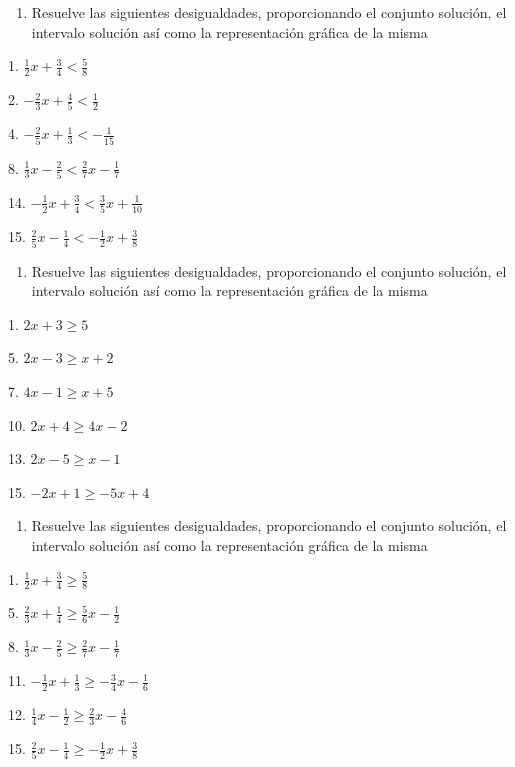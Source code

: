 \documentclass[]{book}
\providecommand{\tightlist}{%
  \setlength{\itemsep}{0pt}\setlength{\parskip}{0pt}}
\begin{document}
\begin{enumerate}
\def\labelenumi{\arabic{enumi}.}
\setcounter{enumi}{8}
\tightlist
\item
  Resuelve las siguientes desigualdades, proporcionando el conjunto
  solución, el intervalo solución así como la representación gráfica de
  la misma
\end{enumerate}

\begin{multicols}{2}
1. $\frac{1}{2}x+\frac{3}{4}<\frac{5}{8}$

2. $-\frac{2}{3}x+\frac{4}{5}<\frac{1}{2}$

4. $-\frac{2}{5}x+\frac{1}{3}<-\frac{1}{15}$

8. $\frac{1}{3}x-\frac{2}{5}<\frac{2}{7}x-\frac{1}{7}$

14. $-\frac{1}{2}x+\frac{3}{4}<\frac{3}{5}x+\frac{1}{10}$

15. $\frac{2}{5}x-\frac{1}{4}<-\frac{1}{2}x+\frac{3}{8}$
\end{multicols}

\begin{enumerate}
\def\labelenumi{\arabic{enumi}.}
\setcounter{enumi}{9}
\tightlist
\item
  Resuelve las siguientes desigualdades, proporcionando el conjunto
  solución, el intervalo solución así como la representación gráfica de
  la misma
\end{enumerate}

\begin{multicols}{2}
1. $2x + 3 \geq 5$

5. $2x - 3 \geq x + 2$

7. $4x - 1 \geq x + 5$

10. $2x + 4 \geq 4x - 2$

13. $2x - 5 \geq x - 1$

15. $-2x + 1 \geq -5x + 4$
\end{multicols}

\begin{enumerate}
\def\labelenumi{\arabic{enumi}.}
\setcounter{enumi}{10}
\tightlist
\item
  Resuelve las siguientes desigualdades, proporcionando el conjunto
  solución, el intervalo solución así como la representación gráfica de
  la misma
\end{enumerate}

\begin{multicols}{2}
1. $\frac{1}{2}x + \frac{3}{4} \geq \frac{5}{8}$

5. $\frac{2}{3}x + \frac{1}{4} \geq \frac{5}{6}x - \frac{1}{2}$

8. $\frac{1}{3}x - \frac{2}{5} \geq \frac{2}{7}x - \frac{1}{7}$

11. $-\frac{1}{2}x + \frac{1}{3} \geq -\frac{3}{4}x - \frac{1}{6}$

12. $\frac{1}{4}x - \frac{1}{2} \geq \frac{2}{3}x - \frac{4}{6}$

15. $\frac{2}{5}x - \frac{1}{4} \geq -\frac{1}{2}x + \frac{3}{8}$
\end{multicols}
\end{document}
